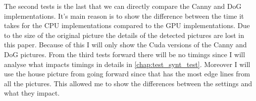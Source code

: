 \begin{table}[H]
\centering
{}
\caption{Timings of the second test for real pictures}
\label{tab:test2c}
\end{table}

The second tests is the last that we can directly compare the \ac{Canny} and \ac{DoG} implementations. It's main reason is to show the difference between the time it takes for the \ac{CPU} implementations compared to the \ac{GPU} implementations. Due to the size of the original picture the details of the detected pictures are lost in this paper. Because of this I will only show the Cuda versions of the \ac{Canny} and \ac{DoG} pictures. From the third tests forward there will be no timings since I will analyse what impacts timings in details in \autoref{chap:test_synt_test}. Moreover I will use the house picture from going forward since that has the most edge lines from all the pictures. This allowed me to show the differences between the settings and what they impact.

